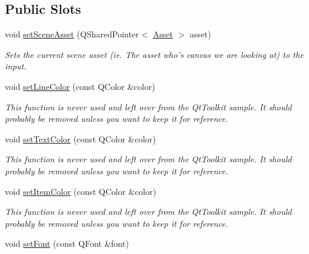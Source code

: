 \subsection*{Public Slots}
\begin{DoxyCompactItemize}
\item 
void \hyperlink{class_diagram_scene_a2ff8ccaa20060c09d3b6b2cba22a7d79}{set\-Scene\-Asset} (Q\-Shared\-Pointer$<$ \hyperlink{class_picto_1_1_asset}{Asset} $>$ asset)
\begin{DoxyCompactList}\small\item\em Sets the current scene asset (ie. The asset who's canvas we are looking at) to the input. \end{DoxyCompactList}\item 
\hypertarget{class_diagram_scene_a08973cbba3a89b1803ac1bc8da064dd6}{void \hyperlink{class_diagram_scene_a08973cbba3a89b1803ac1bc8da064dd6}{set\-Line\-Color} (const Q\-Color \&color)}\label{class_diagram_scene_a08973cbba3a89b1803ac1bc8da064dd6}

\begin{DoxyCompactList}\small\item\em This function is never used and left over from the Qt\-Toolkit sample. It should probably be removed unless you want to keep it for reference. \end{DoxyCompactList}\item 
\hypertarget{class_diagram_scene_a4e7a6208be88eea58687001abbc2fbff}{void \hyperlink{class_diagram_scene_a4e7a6208be88eea58687001abbc2fbff}{set\-Text\-Color} (const Q\-Color \&color)}\label{class_diagram_scene_a4e7a6208be88eea58687001abbc2fbff}

\begin{DoxyCompactList}\small\item\em This function is never used and left over from the Qt\-Toolkit sample. It should probably be removed unless you want to keep it for reference. \end{DoxyCompactList}\item 
\hypertarget{class_diagram_scene_a479732f4ab6aac056fdb52ac925e36e3}{void \hyperlink{class_diagram_scene_a479732f4ab6aac056fdb52ac925e36e3}{set\-Item\-Color} (const Q\-Color \&color)}\label{class_diagram_scene_a479732f4ab6aac056fdb52ac925e36e3}

\begin{DoxyCompactList}\small\item\em This function is never used and left over from the Qt\-Toolkit sample. It should probably be removed unless you want to keep it for reference. \end{DoxyCompactList}\item 
\hypertarget{class_diagram_scene_aed84773b8ec32d8cc9e44517773ff235}{void \hyperlink{class_diagram_scene_aed84773b8ec32d8cc9e44517773ff235}{set\-Font} (const Q\-Font \&font)}\label{class_diagram_scene_aed84773b8ec32d8cc9e44517773ff235}


\end{DoxyCompactItemize}
